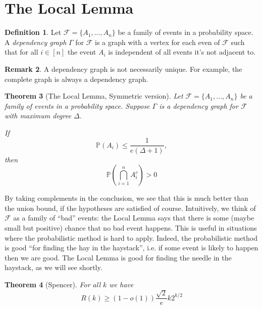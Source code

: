 \documentclass{report}
\theoremstyle{definition}
\theoremstyle{plain}
\newtheorem{thm}{Theorem}
\theoremstyle{definition}
\newtheorem{defn}[thm]{Definition}
\newtheorem{rem}[thm]{Remark}
\begin{document}
	\section{The Local Lemma}
	\begin{defn}
		Let $\mathcal{F} = \{A_1,\ldots, A_n\}$ be a family of events in a probability space. A \emph{dependency graph} $\Gamma$  for $\mathcal{F}$ is a graph with a vertex for each even of $\mathcal{F}$ such that for all $i\in[n]$ the event $A_i$ is independent of all events it's not adjacent to.
	\end{defn}
	\begin{rem}
		A dependency graph is not necessarily unique. For example, the complete graph is always a dependency graph.
	\end{rem}
	\begin{thm}[The Local Lemma, Symmetric version]
		Let $\mathcal{F} = \{A_1,\ldots, A_n\}$ be a family of events in a probability space. Suppose $\Gamma$ is a dependency graph for $\mathcal{F}$ with maximum degree $\Delta$.
		
		If
		\[
			\mathbb{P}(A_i) \leq \frac{1}{e(\Delta + 1)},
		\]
		then
		\[
			\mathbb{P}\left(\bigcap_{i=1}^n A_i^c\right) > 0
		\]
	\end{thm}
	By taking complements in the conclusion, we see that this is much better than the union bound, if the hypotheses are satisfied of course. Intuitively, we think of $\mathcal{F}$ as a family of ``bad'' events: the Local Lemma says that there is some (maybe small but positive) chance that no bad event happens. This is useful in situations where the probabilistic method is hard to apply. Indeed, the probabilistic method is good ``for finding the hay in the haystack'', i.e. if some event is likely to happen then we are good. The Local Lemma is good for finding the needle in the haystack, as we will see shortly.
	\begin{thm}[Spencer]
		For all $k$ we have
		\[
			R(k) \geq (1-o(1))\frac{\sqrt{2}}{e}k2^{k/2}
		\]
	\end{thm}
\end{document}

